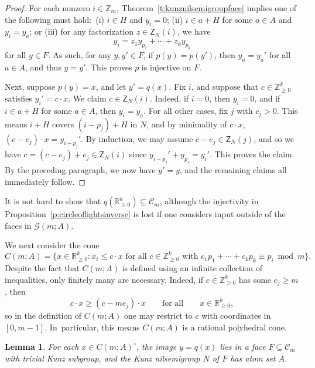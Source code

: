 \documentclass[10pt,a4paper]{amsart}
\newcommand\ZZ{\mathbb{Z}}
\newcommand\RR{\mathbb{R}}
\newcommand\cC{{\mathcal C}}
\newtheorem{lemma}[thm]{Lemma}
\theoremstyle{definition}\newtheorem{defi}[thm]{Definition}
\begin{document}
\begin{proof}
For each nonzero $i \in \ZZ_m$, Theorem~\ref{t:kunznilsemigroupface} implies one of the following must hold:\ (i) $i \in H$ and $y_i = 0$; (ii) $i \in a + H$ for some $a \in A$ and $y_i = y_a$; or (iii) for any factorization $z \in \mathsf Z_N(i)$, we have 
$$y_i = z_1 y_{p_1} + \cdots + z_k y_{p_k}$$
for all $y \in F$.  As such, for any $y, y' \in F$, if $p(y) = p(y')$, then $y_a = y_a'$ for all $a \in A$, and thus $y = y'$.  This proves $p$ is injective on $F$.  

Next, suppose $p(y) = x$, and let $y' = q(x)$.  Fix $i$, and suppose that $c \in \ZZ_{\ge 0}^k$ satisfies $y_i' = c \cdot x$.  We claim $c \in \mathsf Z_N(i)$.  Indeed, if $i = 0$, then $y_i = 0$, and if $i \in a + H$ for some $a \in A$, then $y_i = y_a$.  For all other cases, fix $j$ with $c_j > 0$.  This means $i + H$ covers $(i - p_j) + H$ in $N$, and by minimality of $c \cdot x$, $(c - e_j) \cdot x = y_{i - p_j}'$.  By induction, we may assume $c - e_j \in \mathsf Z_N(j)$, and so we have $c = (c - e_j) + e_j \in \mathsf Z_N(i)$ since $y_{i - p_j}' + y_{p_j} = y_i'$.  This proves the claim.  By the preceding paragraph, we now have $y' = y$, and the remaining claims all immediately follow.  
\end{proof}

It is not hard to show that $q(\RR_{\ge 0}^k) \subseteq \cC_m$, although the injectivity in Proposition~\ref{p:circleoflightsinverse} is lost if one considers input outside of the faces in $\mathcal G(m;A)$.  

We next consider the cone
$$C(m;A) = \{x \in \RR_{\ge 0}^k : x_i \le c \cdot x  \text{ for all } c \in \ZZ_{\ge 0}^k \text{ with } c_1p_1 + \cdots + c_kp_k \equiv p_i \bmod m\}.$$
Despite the fact that $C(m;A)$ is defined using an infinite collection of inequalities, only finitely many are necessary.  Indeed, if $c \in \ZZ_{\ge 0}^k$ has some $c_j \ge m$, then 
$$
c \cdot x \ge (c - me_j) \cdot x
\qquad \text{for all} \qquad
x \in \RR_{\ge 0}^k,
$$
so in the definition of $C(m;A)$ one may restrict to $c$ with coordinates in $[0, m-1]$.  In~particular, this means $C(m;A)$ is a rational polyhedral cone.  


\setcounter{thm}{6}
\begin{lemma}\label{l:interioratomsets}
For each $x \in C(m;A)^\circ$, the image $y = q(x)$ lies in a face $F \subseteq \cC_m$ with trivial Kunz subgroup, and the Kunz nilsemigroup $N$ of $F$ has atom set $A$.  
\end{lemma}
\end{document}
